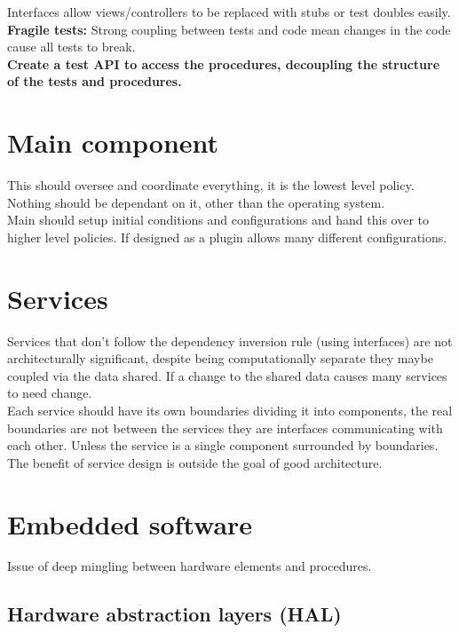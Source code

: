 \documentclass[11pt]{scrartcl} %
\begin{document}
Interfaces allow views/controllers to be replaced with stubs or test doubles easily.\\

\textbf{Fragile tests:} Strong coupling between tests and code mean changes in the code cause all tests to break.\\

\textbf{Create a test API to access the procedures, decoupling the structure of the tests and procedures.}

\section{Main component}

This should oversee and coordinate everything, it is the lowest level policy. Nothing should be
dependant on it, other than the operating system.\\

Main should setup initial conditions and configurations and hand this over to higher level policies.
If designed as a plugin allows many different configurations.

\section{Services}

Services that don't follow the dependency inversion rule (using interfaces) are not architecturally significant,
despite being computationally separate they maybe coupled via the data shared. If a change to the shared data
causes many services to need change.\\

Each service should have its own boundaries dividing it into components, the real boundaries are not between the
services they are interfaces communicating with each other. Unless the service is a single component surrounded by boundaries.\\

The benefit of service design is outside the goal of good architecture.

\section{Embedded software}

Issue of deep mingling between hardware elements and procedures.\\

\subsection{Hardware abstraction layers (HAL)}
\end{document}
